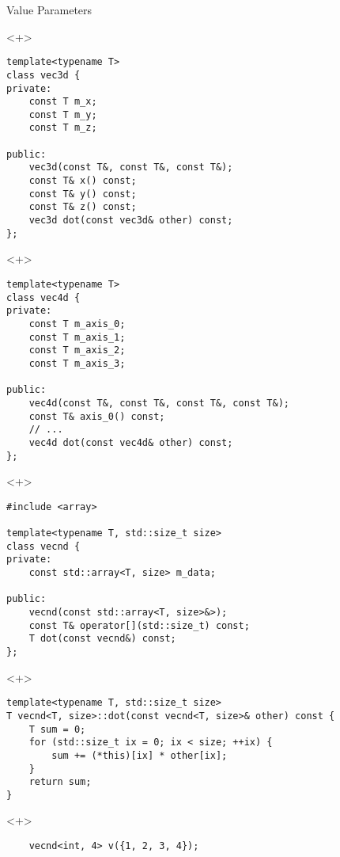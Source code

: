 \documentclass[table]{beamer}
\begin{document}
\begin{frame}[fragile]{Value Parameters}
  \begin{onlyenv}<+>
    \begin{verbatim}
template<typename T>
class vec3d {
private:
    const T m_x;
    const T m_y;
    const T m_z;

public:
    vec3d(const T&, const T&, const T&);
    const T& x() const;
    const T& y() const;
    const T& z() const;
    vec3d dot(const vec3d& other) const;
};
    \end{verbatim}
  \end{onlyenv}

  \begin{onlyenv}<+>
    \begin{verbatim}
template<typename T>
class vec4d {
private:
    const T m_axis_0;
    const T m_axis_1;
    const T m_axis_2;
    const T m_axis_3;

public:
    vec4d(const T&, const T&, const T&, const T&);
    const T& axis_0() const;
    // ...
    vec4d dot(const vec4d& other) const;
};
    \end{verbatim}
  \end{onlyenv}

  \begin{onlyenv}<+>
    \begin{verbatim}
#include <array>

template<typename T, std::size_t size>
class vecnd {
private:
    const std::array<T, size> m_data;

public:
    vecnd(const std::array<T, size>&>);
    const T& operator[](std::size_t) const;
    T dot(const vecnd&) const;
};
    \end{verbatim}
  \end{onlyenv}

  \begin{onlyenv}<+>
    \begin{verbatim}
template<typename T, std::size_t size>
T vecnd<T, size>::dot(const vecnd<T, size>& other) const {
    T sum = 0;
    for (std::size_t ix = 0; ix < size; ++ix) {
        sum += (*this)[ix] * other[ix];
    }
    return sum;
}
    \end{verbatim}
  \end{onlyenv}

  \begin{onlyenv}<+>
    \begin{verbatim}
    vecnd<int, 4> v({1, 2, 3, 4});
    \end{verbatim}
  \end{onlyenv}
\end{frame}
\end{document}
